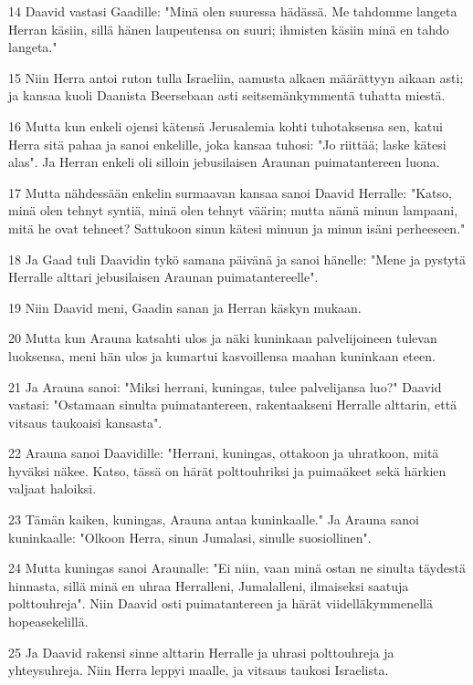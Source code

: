 \par 14 Daavid vastasi Gaadille: "Minä olen suuressa hädässä. Me tahdomme langeta Herran käsiin, sillä hänen laupeutensa on suuri; ihmisten käsiin minä en tahdo langeta."
\par 15 Niin Herra antoi ruton tulla Israeliin, aamusta alkaen määrättyyn aikaan asti; ja kansaa kuoli Daanista Beersebaan asti seitsemänkymmentä tuhatta miestä.
\par 16 Mutta kun enkeli ojensi kätensä Jerusalemia kohti tuhotaksensa sen, katui Herra sitä pahaa ja sanoi enkelille, joka kansaa tuhosi: "Jo riittää; laske kätesi alas". Ja Herran enkeli oli silloin jebusilaisen Araunan puimatantereen luona.
\par 17 Mutta nähdessään enkelin surmaavan kansaa sanoi Daavid Herralle: "Katso, minä olen tehnyt syntiä, minä olen tehnyt väärin; mutta nämä minun lampaani, mitä he ovat tehneet? Sattukoon sinun kätesi minuun ja minun isäni perheeseen."
\par 18 Ja Gaad tuli Daavidin tykö samana päivänä ja sanoi hänelle: "Mene ja pystytä Herralle alttari jebusilaisen Araunan puimatantereelle".
\par 19 Niin Daavid meni, Gaadin sanan ja Herran käskyn mukaan.
\par 20 Mutta kun Arauna katsahti ulos ja näki kuninkaan palvelijoineen tulevan luoksensa, meni hän ulos ja kumartui kasvoillensa maahan kuninkaan eteen.
\par 21 Ja Arauna sanoi: "Miksi herrani, kuningas, tulee palvelijansa luo?" Daavid vastasi: "Ostamaan sinulta puimatantereen, rakentaakseni Herralle alttarin, että vitsaus taukoaisi kansasta".
\par 22 Arauna sanoi Daavidille: "Herrani, kuningas, ottakoon ja uhratkoon, mitä hyväksi näkee. Katso, tässä on härät polttouhriksi ja puimaäkeet sekä härkien valjaat haloiksi.
\par 23 Tämän kaiken, kuningas, Arauna antaa kuninkaalle." Ja Arauna sanoi kuninkaalle: "Olkoon Herra, sinun Jumalasi, sinulle suosiollinen".
\par 24 Mutta kuningas sanoi Araunalle: "Ei niin, vaan minä ostan ne sinulta täydestä hinnasta, sillä minä en uhraa Herralleni, Jumalalleni, ilmaiseksi saatuja polttouhreja". Niin Daavid osti puimatantereen ja härät viidelläkymmenellä hopeasekelillä.
\par 25 Ja Daavid rakensi sinne alttarin Herralle ja uhrasi polttouhreja ja yhteysuhreja. Niin Herra leppyi maalle, ja vitsaus taukosi Israelista.


